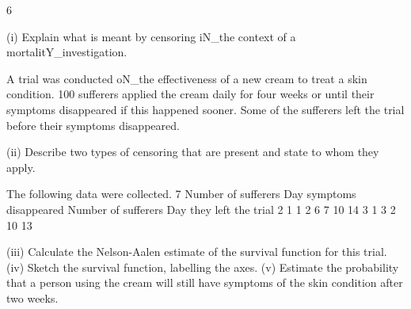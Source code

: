 6
\item (i)
Explain what is meant by censoring iN_the context of a mortalitY_investigation.

A trial was conducted oN_the effectiveness of a new cream to treat a skin condition.
100 sufferers applied the cream daily for four weeks or until their symptoms
disappeared if this happened sooner. Some of the sufferers left the trial before their
symptoms disappeared.
\item (ii)
Describe two types of censoring that are present and state to whom they apply.

The following data were collected.
7
Number of
sufferers Day symptoms
disappeared Number of
sufferers Day they left
the trial
2
1
1
2 6
7
10
14 3
1
3 2
10
13
\item (iii) Calculate the Nelson-Aalen estimate of the survival function for this trial. 
(iv) Sketch the survival function, labelling the axes.
(v) Estimate the probability that a person using the cream will still have symptoms
of the skin condition after two weeks.


